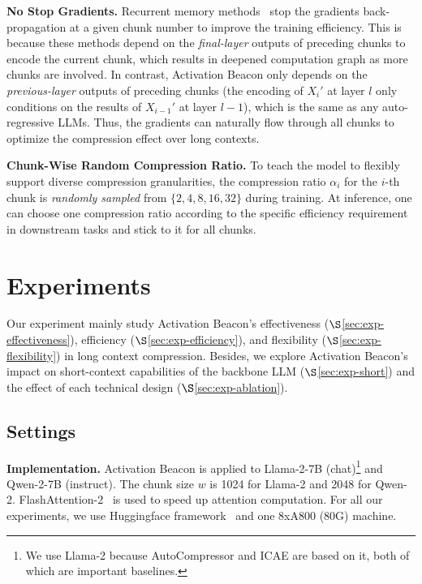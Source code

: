\textbf{No Stop Gradients.} Recurrent memory methods~\citep{chevalier2023autocompressors,aydar2023recurrent_memory_transformer} stop the gradients back-propagation at a given chunk number to improve the training efficiency. This is because these methods depend on the \textit{final-layer} outputs of preceding chunks to encode the current chunk, which results in deepened computation graph as more chunks are involved. In contrast, Activation Beacon only depends on the \textit{previous-layer} outputs of preceding chunks (the encoding of $X_i'$ at layer $l$ only conditions on the results of $X_{i-1}'$ at layer $l-1$), which is the same as any auto-regressive LLMs. Thus, the gradients can naturally flow through all chunks to optimize the compression effect over long contexts.

\textbf{Chunk-Wise Random Compression Ratio.} To teach the model to flexibly support diverse compression granularities, the compression ratio $\alpha_i$ for the $i$-th chunk is \textit{randomly sampled} from $\{2,4,8,16,32\}$ during training. At inference, one can choose one compression ratio according to the specific efficiency requirement in downstream tasks and stick to it for all chunks.

\section{Experiments}
Our experiment mainly study Activation Beacon's effectiveness ($\S$\ref{sec:exp-effectiveness}), efficiency ($\S$\ref{sec:exp-efficiency}), and flexibility ($\S$\ref{sec:exp-flexibility}) in long context compression. Besides, we explore Activation Beacon's impact on short-context capabilities of the backbone LLM ($\S$\ref{sec:exp-short}) and the effect of each technical design ($\S$\ref{sec:exp-ablation}).

\subsection{Settings}

\textbf{Implementation.} Activation Beacon is applied to Llama-2-7B (chat)\footnote{We use Llama-2 because AutoCompressor and ICAE are based on it, both of which are important baselines.} and Qwen-2-7B (instruct). The chunk size $w$ is 1024 for Llama-2 and 2048 for Qwen-2. FlashAttention-2~\citep{dao2023flash} is used to speed up attention computation. For all our experiments, we use Huggingface framework~\citep{huggingface} and one 8xA800 (80G) machine.

